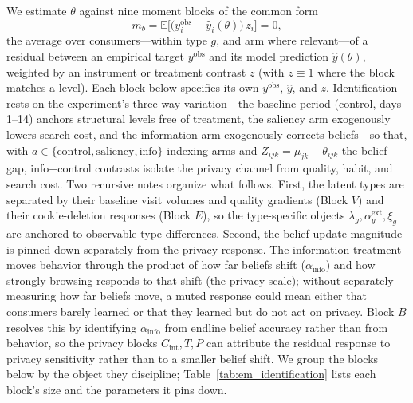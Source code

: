 \documentclass[12pt]{article}
\theoremstyle{definition}
\newcommand{\E}{\mathbb{E}}
\theoremstyle{remark}
\begin{document}
We estimate $\theta$ against nine moment blocks of the common form
\begin{equation}\label{eq:em_moment}
  m_b = \E\bigl[\bigl(y^{\text{obs}}_{i} - \hat y_{i}(\theta)\bigr)\, z_{i}\bigr] = 0,
\end{equation}
the average over consumers---within type $g$, and arm where relevant---of a residual between an empirical target $y^{\text{obs}}$ and its model prediction $\hat y(\theta)$, weighted by an instrument or treatment contrast $z$ (with $z \equiv 1$ where the block matches a level). Each block below specifies its own $y^{\text{obs}}$, $\hat y$, and $z$. Identification rests on the experiment's three-way variation---the baseline period (control, days 1--14) anchors structural levels free of treatment, the saliency arm exogenously lowers search cost, and the information arm exogenously corrects beliefs---so that, with $a \in \{\text{control}, \text{saliency}, \text{info}\}$ indexing arms and $Z_{ijk} = \mu_{jk} - \theta_{ijk}$ the belief gap, info$-$control contrasts isolate the privacy channel from quality, habit, and search cost. Two recursive notes organize what follows. First, the latent types are separated by their baseline visit volumes and quality gradients (Block $V$) and their cookie-deletion responses (Block $E$), so the type-specific objects $\lambda_g, \alpha^{\text{ext}}_g, \xi_g$ are anchored to observable type differences. Second, the belief-update magnitude is pinned down separately from the privacy response. The information treatment moves behavior through the product of how far beliefs shift ($\alpha_{\text{info}}$) and how strongly browsing responds to that shift (the privacy scale); without separately measuring how far beliefs move, a muted response could mean either that consumers barely learned or that they learned but do not act on privacy. Block $B$ resolves this by identifying $\alpha_{\text{info}}$ from endline belief accuracy rather than from behavior, so the privacy blocks $C_{\text{int}}, T, P$ can attribute the residual response to privacy sensitivity rather than to a smaller belief shift. We group the blocks below by the object they discipline; Table~\ref{tab:em_identification} lists each block's size and the parameters it pins down. 
\end{document}
